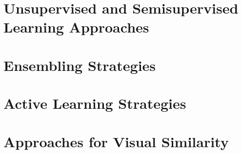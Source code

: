 \section{Unsupervised and Semisupervised Learning Approaches}
\label{unsup}


\section{Ensembling Strategies}
\label{bg_ensembling}


\section{Active Learning Strategies}
\label{bg_al}


\section{Approaches for Visual Similarity}
\label{bg_sim}
